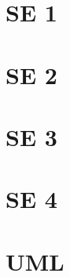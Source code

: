 \chapter{SE 1}

\clearpage


\chapter{SE 2}

\clearpage


\chapter{SE 3}

\clearpage


\chapter{SE 4}

\clearpage


\chapter{UML}

\clearpage
